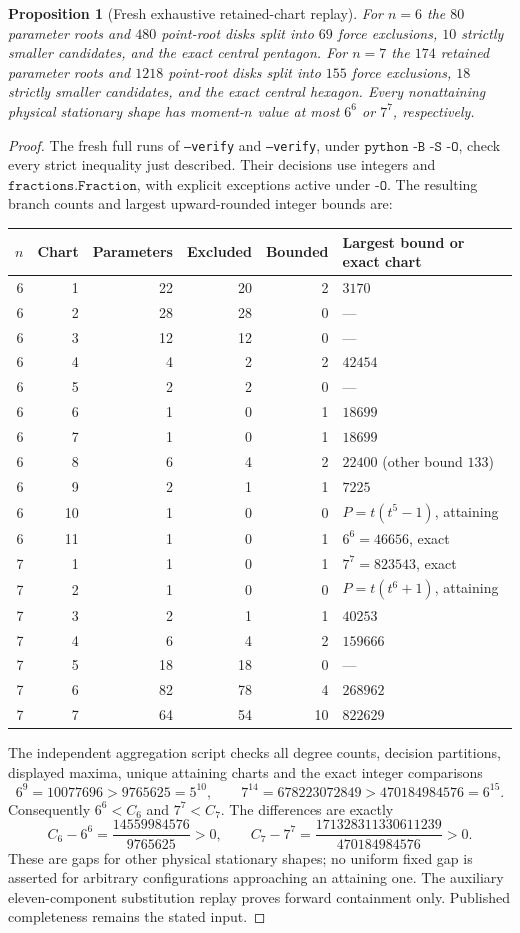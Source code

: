 \documentclass[11pt,a4paper]{article}
\newtheorem{proposition}[theorem]{Proposition}
\theoremstyle{remark}
\begin{document}
\begin{proposition}[Fresh exhaustive retained-chart replay]
\label{prop:cb67-replay}
For $n=6$ the $80$ parameter roots and $480$ point-root disks split into
$69$ force exclusions, $10$ strictly smaller candidates, and the exact
central pentagon. For $n=7$ the $174$ retained parameter roots and $1218$
point-root disks split into $155$ force exclusions, $18$ strictly smaller
candidates, and the exact central hexagon. Every nonattaining physical
stationary shape has moment-$n$ value at most $6^6$ or $7^7$, respectively.
\end{proposition}
\begin{proof}
The fresh full runs of  \texttt{--verify} and
 \texttt{--verify}, under
$\texttt{python -B -S -O}$, check every strict inequality just described.
Their decisions use integers and $\texttt{fractions.Fraction}$, with
explicit exceptions active under $\texttt{-O}$. The resulting branch
counts and largest upward-rounded integer bounds are:
\begin{center}\begin{tabular}{rrrrrl}
\toprule
$n$&Chart&Parameters&Excluded&Bounded&Largest bound or exact chart\\
\midrule
6&1&22&20&2&$3170$\\
6&2&28&28&0&---\\
6&3&12&12&0&---\\
6&4&4&2&2&$42454$\\
6&5&2&2&0&---\\
6&6&1&0&1&$18699$\\
6&7&1&0&1&$18699$\\
6&8&6&4&2&$22400$ (other bound $133$)\\
6&9&2&1&1&$7225$\\
6&10&1&0&0&$P=t(t^5-1)$, attaining\\
6&11&1&0&1&$6^6=46656$, exact\\
\midrule
7&1&1&0&1&$7^7=823543$, exact\\
7&2&1&0&0&$P=t(t^6+1)$, attaining\\
7&3&2&1&1&$40253$\\
7&4&6&4&2&$159666$\\
7&5&18&18&0&---\\
7&6&82&78&4&$268962$\\
7&7&64&54&10&$822629$\\
\bottomrule
\end{tabular}\end{center}
The independent aggregation script checks all degree counts, decision
partitions, displayed maxima, unique attaining charts and the exact
integer comparisons
\[
 6^9=10077696>9765625=5^{10},\qquad
 7^{14}=678223072849>470184984576=6^{15}.
\]
Consequently $6^6<C_6$ and $7^7<C_7$. The differences are exactly
\[
 C_6-6^6=\frac{14559984576}{9765625}>0,\qquad
 C_7-7^7=\frac{171328311330611239}{470184984576}>0.
\]
These are gaps for other physical stationary shapes; no uniform fixed gap
is asserted for arbitrary configurations approaching an attaining one.
The auxiliary eleven-component substitution replay proves forward
containment only. Published completeness remains the stated input.
\end{proof}
\end{document}
